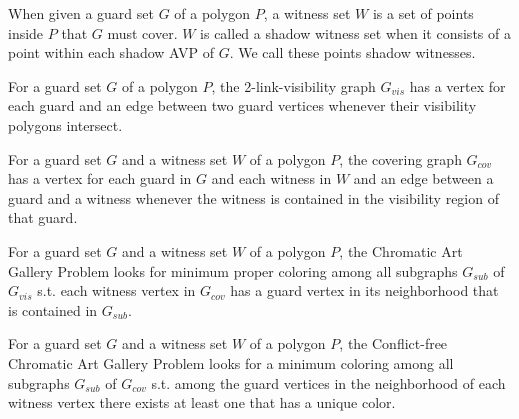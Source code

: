 \begin{definition}
When given a guard set $G$ of a polygon $P$, a witness set $W$ is a set of points inside $P$ that $G$ must cover. $W$ is called a shadow witness set when it consists of a point within each shadow AVP of $G$. We call these points shadow witnesses.
\end{definition}

\begin{definition}
For a guard set $G$ of a polygon $P$, the 2-link-visibility graph $G_{vis}$ has a vertex for each guard and an edge between two guard vertices whenever their visibility polygons intersect.
\end{definition}

\begin{definition}
For a guard set $G$ and a witness set $W$ of a polygon $P$, the covering graph $G_{cov}$ has a vertex for each guard in $G$ and each witness in $W$ and an edge between a guard and a witness whenever the witness is contained in the visibility region of that guard.
\end{definition}

\begin{definition}
For a guard set $G$ and a witness set $W$ of a polygon $P$, the Chromatic Art Gallery Problem looks for minimum proper coloring among all subgraphs $G_{sub}$ of $G_{vis}$ s.t. each witness vertex in $G_{cov}$ has a guard vertex in its neighborhood that is contained in $G_{sub}$.
\end{definition}

\begin{definition}
For a guard set $G$ and a witness set $W$ of a polygon $P$, the Conflict-free Chromatic Art Gallery Problem looks for a minimum coloring among all subgraphs $G_{sub}$ of $G_{cov}$ s.t. among the guard vertices in the neighborhood of each witness vertex there exists at least one that has a unique color.
\end{definition}